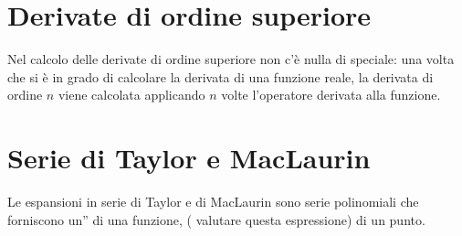\documentclass[letterpaper,10pt,italian]{jupyterBook}
\begin{document}
\section{Derivate di ordine superiore}
\label{\detokenize{ch/infinitesimal_calculus/derivatives:derivate-di-ordine-superiore}}\label{\detokenize{ch/infinitesimal_calculus/derivatives:infinitesimal-calculus-derivatives-higher}}
\sphinxAtStartPar
Nel calcolo delle derivate di ordine superiore non c’è nulla di speciale: una volta che si è in grado di calcolare la derivata di una funzione reale, la derivata di ordine \(n\) viene calcolata applicando \(n\) volte l’operatore derivata alla funzione.


\section{Serie di Taylor e MacLaurin}
\label{\detokenize{ch/infinitesimal_calculus/derivatives:serie-di-taylor-e-maclaurin}}\label{\detokenize{ch/infinitesimal_calculus/derivatives:infinitesimal-calculus-derivatives-taylor}}
\sphinxAtStartPar
Le espansioni in serie di Taylor e di MacLaurin sono serie polinomiali che forniscono un” di una funzione,  ( valutare questa espressione) di un punto.
\end{document}
